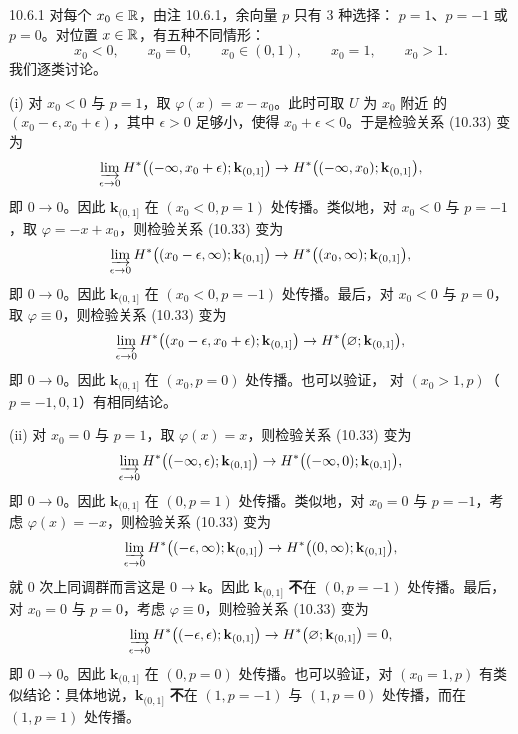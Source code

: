 \begin{wexam}{10.6.1}
对每个 $x_0\in\mathbb{R}$，由注 10.6.1，余向量 $p$ 只有 $3$ 种选择：
$p=1$、$p=-1$ 或 $p=0$。对位置 $x\in\mathbb{R}$，有五种不同情形：
\[
  x_0<0,\qquad x_0=0,\qquad x_0\in(0,1),\qquad x_0=1,\qquad x_0>1 .
\]
我们逐类讨论。

(i) 对 $x_0<0$ 与 $p=1$，取 $\varphi(x)=x-x_0$。此时可取 $U$ 为 $x_0$ 附近
的 $(x_0-\epsilon,x_0+\epsilon)$，其中 $\epsilon>0$ 足够小，使得
$x_0+\epsilon<0$。于是检验关系 (10.33) 变为
\[
  \varinjlim_{\epsilon\to0}H^*\bigl((-\infty,x_0+\epsilon);
  \mathbf{k}_{(0,1]}\bigr)
  \to H^*\bigl((-\infty,x_0);\mathbf{k}_{(0,1]}\bigr),
\]
即 $0\to0$。因此 $\mathbf{k}_{(0,1]}$ 在 $(x_0<0,p=1)$ 处传播。类似地，对
$x_0<0$ 与 $p=-1$，取 $\varphi=-x+x_0$，则检验关系 (10.33) 变为
\[
  \varinjlim_{\epsilon\to0}H^*\bigl((x_0-\epsilon,\infty);
  \mathbf{k}_{(0,1]}\bigr)
  \to H^*\bigl((x_0,\infty);\mathbf{k}_{(0,1]}\bigr),
\]
即 $0\to0$。因此 $\mathbf{k}_{(0,1]}$ 在 $(x_0<0,p=-1)$ 处传播。最后，对
$x_0<0$ 与 $p=0$，取 $\varphi\equiv0$，则检验关系 (10.33) 变为
\[
  \varinjlim_{\epsilon\to0}H^*\bigl((x_0-\epsilon,x_0+\epsilon);
  \mathbf{k}_{(0,1]}\bigr)
  \to H^*\bigl(\varnothing;\mathbf{k}_{(0,1]}\bigr),
\]
即 $0\to0$。因此 $\mathbf{k}_{(0,1]}$ 在 $(x_0,p=0)$ 处传播。也可以验证，
对 $(x_0>1,p)$（$p=-1,0,1$）有相同结论。

(ii) 对 $x_0=0$ 与 $p=1$，取 $\varphi(x)=x$，则检验关系 (10.33) 变为
\[
  \varinjlim_{\epsilon\to0}H^*\bigl((-\infty,\epsilon);
  \mathbf{k}_{(0,1]}\bigr)\to H^*\bigl((-\infty,0);
  \mathbf{k}_{(0,1]}\bigr),
\]
即 $0\to0$。因此 $\mathbf{k}_{(0,1]}$ 在 $(0,p=1)$ 处传播。类似地，对
$x_0=0$ 与 $p=-1$，考虑 $\varphi(x)=-x$，则检验关系 (10.33) 变为
\[
  \varinjlim_{\epsilon\to0}H^*\bigl((-\epsilon,\infty);
  \mathbf{k}_{(0,1]}\bigr)\to H^*\bigl((0,\infty);
  \mathbf{k}_{(0,1]}\bigr),
\]
就 $0$ 次上同调群而言这是 $0\to\mathbf{k}$。因此 $\mathbf{k}_{(0,1]}$
\textbf{不}在 $(0,p=-1)$ 处传播。最后，对 $x_0=0$ 与 $p=0$，考虑
$\varphi\equiv0$，则检验关系 (10.33) 变为
\[
  \varinjlim_{\epsilon\to0}H^*\bigl((-\epsilon,\epsilon);
  \mathbf{k}_{(0,1]}\bigr)\to
  H^*\bigl(\varnothing;\mathbf{k}_{(0,1]}\bigr)=0,
\]
即 $0\to0$。因此 $\mathbf{k}_{(0,1]}$ 在 $(0,p=0)$ 处传播。也可以验证，对
$(x_0=1,p)$ 有类似结论：具体地说，$\mathbf{k}_{(0,1]}$ \textbf{不}在
$(1,p=-1)$ 与 $(1,p=0)$ 处传播，而在 $(1,p=1)$ 处传播。


\end{wexam}
